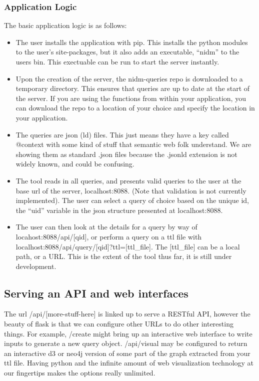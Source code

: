\documentclass[letterpaper,10pt,english]{sphinxmanual}
\begin{document}
\subsubsection{Application Logic}
\label{development:application-logic}
The basic application logic is as follows:
\begin{itemize}
\item {} 
The user installs the application with pip. This installs the python modules to the user's site-packages, but it also adds an executable, ``nidm'' to the users bin. This exectuable can be run to start the server instantly.

\item {} 
Upon the creation of the server, the nidm-queries repo is downloaded to a temporary directory. This ensures that queries are up to date at the start of the server. If you are using the functions from within your application, you can download the repo to a location of your choice and specify the location in your application.

\item {} 
The queries are json (ld) files. This just means they have a key called @context with some kind of stuff that semantic web folk understand. We are showing them as standard .json files because the .jsonld extension is not widely known, and could be confusing.

\item {} 
The tool reads in all queries, and presents valid queries to the user at the base url of the server, localhost:8088. (Note that validation is not currently implemented). The user can select a query of choice based on the unique id, the ``uid'' variable in the json structure presented at localhost:8088.

\item {} 
The user can then look at the details for a query by way of locahost:8088/api/{[}qid{]}, or perform a query on a ttl file with localhost:8088/api/query/{[}qid{]}?ttl={[}ttl\_file{]}. The {[}ttl\_file{]} can be a local path, or a URL. This is the extent of the tool thus far, it is still under development.

\end{itemize}


\subsection{Serving an API and web interfaces}
\label{development:serving-an-api-and-web-interfaces}
The url /api/{[}more-stuff-here{]} is linked up to serve a RESTful API, however the beauty of flask is that we can configure other URLs to do other interesting things. For example, /create might bring up an interactive web interface to write inputs to generate a new query object. /api/visual may be configured to return an interactive d3 or neo4j version of some part of the graph extracted from your ttl file. Having python and the infinite amount of web visualization technology at our fingertips makes the options really unlimited.
\end{document}
